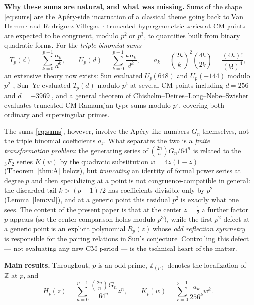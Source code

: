 \documentclass[11pt]{amsart}
\theoremstyle{definition}
\theoremstyle{remark}
\newcommand{\Z}{\mathbb{Z}}
\newcommand{\Zp}{\mathbb{Z}_{(p)}}
\begin{document}
\textbf{Why these sums are natural, and what was missing.}
Sums of the shape \eqref{eq:sums} are the Ap\'ery-side incarnation of a
classical theme going back to Van Hamme \cite{vH} and
Rodriguez-Villegas~\cite{RV}: truncated hypergeometric series at CM
points are expected to be congruent, modulo $p^2$ or $p^3$, to quantities
built from binary quadratic forms. For the \emph{triple binomial sums}
\begin{equation}\label{eq:TU}
T_p(d)=\sum_{k=0}^{p-1}\frac{a_k}{d^k},
\qquad
U_p(d)=\sum_{k=0}^{p-1}\frac{k\,a_k}{d^k},
\qquad
a_k=\binom{2k}{k}^2\binom{4k}{2k}=\frac{(4k)!}{(k!)^4},
\end{equation}
an extensive theory now exists: Sun evaluated $U_p(648)$ and $U_p(-144)$
modulo $p^2$ \cite[Theorems~2.9, 2.10]{SunBQF}, Sun--Ye evaluated
$T_p(d)$ modulo $p^3$ at several CM points including $d=256$ and
$d=-3969$ \cite[Theorems~1.5, 1.8]{SunYe}, and a general theorem of
Chisholm--Deines--Long--Nebe--Swisher \cite[Theorem~1]{CDLNS} evaluates
truncated CM Ramanujan-type sums modulo $p^2$, covering both ordinary
and supersingular primes.

The sums \eqref{eq:sums}, however, involve the Ap\'ery-like numbers
$G_n$ themselves, not the triple binomial coefficients $a_k$. What
separates the two is a \emph{finite transformation problem}: the
generating series of $\binom{2n}{n}G_n/64^n$ is related to the
${}_3F_2$ series $K(w)$ by the quadratic substitution $w=4z(1-z)$
(Theorem~\ref{thm:A} below), but \emph{truncating} an identity of formal
power series at degree $p$ and then specializing at a point is not
congruence-compatible in general: the discarded tail $k>(p-1)/2$ has
coefficients divisible only by $p^2$ (Lemma~\ref{lem:val}), and at a
generic point this residual $p^2$ is exactly what one sees. The content
of the present paper is that at the center $z=\frac12$ a further factor
$p$ appears (so the center comparison holds modulo $p^3$), while the
first $p^2$-defect at a generic point is an explicit polynomial
$R_p(z)$ whose \emph{odd reflection symmetry} is responsible for the
pairing relations in Sun's conjecture. Controlling this defect ---
not evaluating any new CM period --- is the technical heart of the
matter.

\medskip

\textbf{Main results.} Throughout, $p$ is an odd prime,
$\Zp$ denotes the localization of $\Z$ at $p$, and
\[
H_p(z)=\sum_{n=0}^{p-1}\frac{\binom{2n}{n}G_n}{64^n}z^n,
\qquad
K_p(w)=\sum_{k=0}^{p-1}\frac{a_k}{256^k}w^k .
\]
\end{document}
